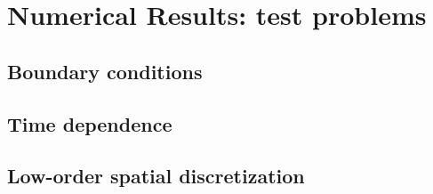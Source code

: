 
\chapter{Numerical Results: test problems}

\section{Boundary conditions}

\section{Time dependence}

\section{Low-order spatial discretization}

